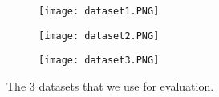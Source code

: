 \documentclass[thesis.tex]{subfiles}
\begin{document}
\begin{figure}[h]
\centering
\begin{subfigure}{0.30\textwidth}
		\texttt{[image: dataset1.PNG]}
	\caption{}		
	\end{subfigure}
\begin{subfigure}{0.30\textwidth}
		\texttt{[image: dataset2.PNG]}
	\caption{}		
	\end{subfigure}
\begin{subfigure}{0.30\textwidth}
		\texttt{[image: dataset3.PNG]}
	\caption{}		
	\end{subfigure}

\caption{The 3 datasets that we use for evaluation.}
\label{fig:datasets}
\end{figure}
\end{document}
